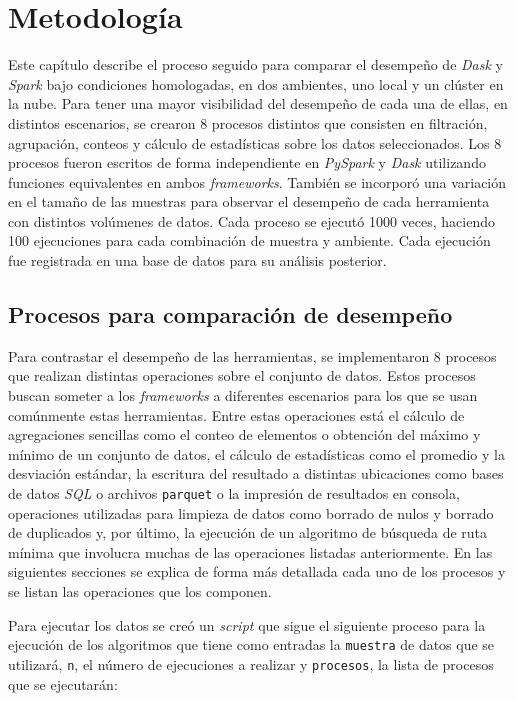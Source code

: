 \chapter{Metodología}

\noindent Este capítulo describe el proceso seguido para comparar el desempeño de \textit{Dask} y \textit{Spark} bajo condiciones homologadas, en dos ambientes, uno local y un clúster en la nube. Para tener una mayor visibilidad del desempeño de cada una de ellas, en distintos escenarios, se crearon 8 procesos distintos que consisten en filtración, agrupación, conteos y cálculo de estadísticas sobre los datos seleccionados. Los 8 procesos fueron escritos de forma independiente en \textit{PySpark} y \textit{Dask} utilizando funciones equivalentes en ambos \textit{frameworks}. También se incorporó una variación en el tamaño de las muestras para observar el desempeño de cada herramienta con distintos volúmenes de datos. Cada proceso se ejecutó 1000 veces, haciendo 100 ejecuciones para cada combinación de muestra y ambiente. Cada ejecución fue registrada en una base de datos para su análisis posterior. 
\newpage

\section{Procesos para comparación de desempeño}

Para contrastar el desempeño de las herramientas, se implementaron 8 procesos que realizan distintas operaciones sobre el conjunto de datos. Estos procesos buscan someter a los \textit{frameworks} a diferentes escenarios para los que se usan comúnmente estas herramientas. Entre estas operaciones está el cálculo de agregaciones sencillas como el conteo de elementos o obtención del máximo y mínimo de un conjunto de datos, el cálculo de estadísticas como el promedio y la desviación estándar, la escritura del resultado a distintas ubicaciones como bases de datos \textit{SQL} o archivos \texttt{parquet} o la impresión de resultados en consola, operaciones utilizadas para limpieza de datos como borrado de nulos y borrado de duplicados y, por último, la ejecución de un algoritmo de búsqueda de ruta mínima que involucra muchas de las operaciones listadas anteriormente. En las siguientes secciones se explica de forma más detallada cada uno de los procesos y se listan las operaciones que los componen.

Para ejecutar los datos se creó un \textit{script} que sigue el siguiente proceso para la ejecución de los algoritmos que tiene como entradas la \texttt{muestra} de datos que se utilizará, \texttt{n}, el número de ejecuciones a realizar y \texttt{procesos}, la lista de procesos que se ejecutarán:

